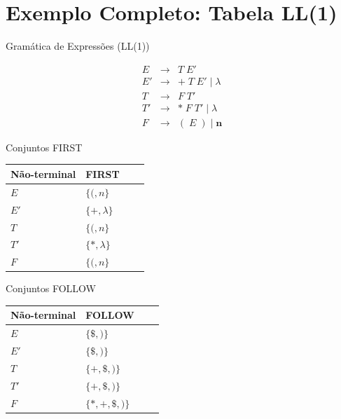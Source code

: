 \section{Exemplo Completo: Tabela
LL(1)}\label{exemplo-completo-tabela-ll1}

\begin{frame}{Gramática de Expressões (LL(1))}

    \[\begin{array}{lcl}
    E  &\to& T\; E' \\
    E' &\to& +\; T\; E' \mid \lambda \\
    T  &\to& F\; T' \\
    T' &\to& *\; F\; T' \mid \lambda \\
    F  &\to& (\; E\; ) \mid \mathbf{n}
\end{array}\]
\end{frame}

\begin{frame}{Conjuntos FIRST}

    \begin{table}
        \begin{tabular}{l l l l}
            \hline
            Não-terminal & FIRST \\
            \hline
            \(E\) & \(\{(, n\}\) \\
            \(E'\) & \(\{+, \lambda\}\) \\
            \(T\) & \(\{(, n\}\) \\
            \(T'\) & \(\{*, \lambda\}\) \\
            \(F\) & \(\{(, n\}\) \\
            \hline
        \end{tabular}
    \end{table}
\end{frame}

\begin{frame}{Conjuntos FOLLOW}

    \begin{table}
        \begin{tabular}{l l l l}
            \hline
            Não-terminal & FOLLOW \\
            \hline
            \(E\) & \(\{\$, )\}\) \\
            \(E'\) & \(\{\$, )\}\) \\
            \(T\) & \(\{+, \$, )\}\) \\
            \(T'\) & \(\{+, \$, )\}\) \\
            \(F\) & \(\{*, +, \$, )\}\) \\
            \hline
        \end{tabular}
    \end{table}
\end{frame}


